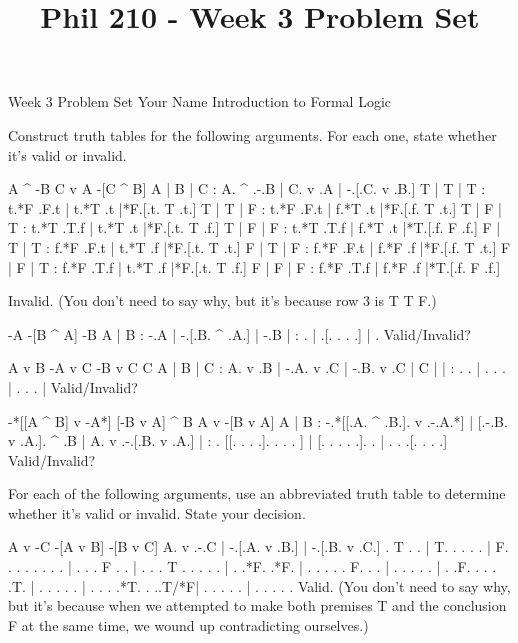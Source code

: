
\title{Phil 210 - Week 3 Problem Set}

\heading
Week 3 Problem Set
Your Name
Introduction to Formal Logic
\endheading

Construct truth tables for the following arguments. For each one, state whether it's valid or invalid.

\problems
{}
\argument
 A ^ -B
 C v A
\argumentline
 -[C ^ B]
\endargument
	\answer
	\truthtable
	 A | B | C : A. ^ .-.B | C. v .A | -.[.C. v .B.]
	\truthtableline
	 T | T | T : t.*F .F.t | t.*T .t |*F.[.t. T .t.]
	 T | T | F : t.*F .F.t | f.*T .t |*F.[.f. T .t.]
	 T | F | T : t.*T .T.f | t.*T .t |*F.[.t. T .f.]
	 T | F | F : t.*T .T.f | f.*T .t |*T.[.f. F .f.]
	 F | T | T : f.*F .F.t | t.*T .f |*F.[.t. T .t.]
	 F | T | F : f.*F .F.t | f.*F .f |*F.[.f. T .t.]
	 F | F | T : f.*F .T.f | t.*T .f |*F.[.t. T .f.]
	 F | F | F : f.*F .T.f | f.*F .f |*T.[.f. F .f.]
	\endtruthtable

	Invalid. (You don't need to say why, but it's because row 3 is T T F.)
	\endanswer

\argument
 -A
 -[B ^ A]
\argumentline
 -B
\endargument
	\answer
	\truthtable
	 A | B : -.A | -.[.B. ^ .A.] | -.B
	\truthtableline
	   |   :  .  |  .[. .   . .] |  . 
	\endtruthtable
	Valid/Invalid?
	\endanswer

\argument
 A v B
 -A v C
 -B v C
\argumentline
 C
\endargument
	\answer
	\truthtable
	 A | B | C : A. v .B | -.A. v .C | -.B. v .C | C
	\truthtableline
	   |   |   :  .   .  |  . .   .  |  . .   .  |  
	\endtruthtable
	Valid/Invalid?
	\endanswer

\argument
 -*[[A ^ B] v -A*]
 [-B v A] ^ B
\argumentline
 A v -[B v A]
\endargument
	\answer
	\truthtable
	 A | B : -.*[[.A. ^ .B.]. v .-.A.*] | [.-.B. v .A.]. ^ .B | A. v .-.[.B. v .A.]
	\truthtableline
	   |   :  . [[. .   . .].   . . . ] | [. . .   . .].   .  |  .   . .[. .   . .]
	\endtruthtable
	Valid/Invalid?
	\endanswer
\endproblems

For each of the following arguments, use an abbreviated truth table to determine whether it's valid or invalid. State your decision.

\problems
{}
\argument
 A v -C
 -[A v B]
\argumentline
 -[B v C]
\endargument
	\answer
	\truthtable
	 A. v .-.C | -.[.A. v .B.] | -.[.B. v .C.]
	\truthtableline
	  . T . .  | T. . .   . .  | F. . .   . .
	  .   . .  |  . . . F . .  |  . . . T . .
	  .   . .  |  . .*F.  .*F. |  . . .   . .
	 F.   . .  |  . . .   . .  |  . .F.   . .
	  .   .T.  |  . . .   . .  |  . . .   .*T.
	  .  ..T/*F|  . . .   . .  |  . . .   . .
	\endtruthtable
	Valid. (You don't need to say why, but it's because when we attempted to make both premises T and the conclusion F at the same time, we wound up contradicting ourselves.)
	\endanswer

